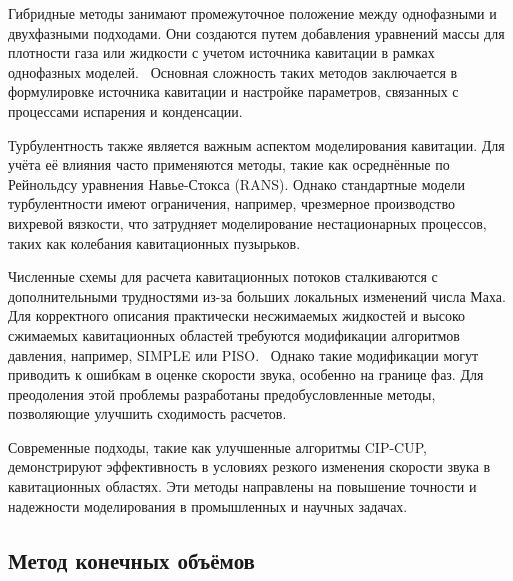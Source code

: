 Гибридные методы занимают промежуточное положение между однофазными и двухфазными подходами. Они создаются путем добавления уравнений массы для плотности газа или жидкости с учетом источника кавитации в рамках однофазных моделей.~\cite{10.1016/s0045-7930(99)00039-0, 10.1007/s00773-003-0162-6} Основная сложность таких методов заключается в формулировке источника кавитации и настройке параметров, связанных с процессами испарения и конденсации.

Турбулентность также является важным аспектом моделирования кавитации. Для учёта её влияния часто применяются методы, такие как осреднённые по Рейнольдсу уравнения Навье-Стокса (RANS). Однако стандартные модели турбулентности имеют ограничения, например, чрезмерное производство вихревой вязкости, что затрудняет моделирование нестационарных процессов, таких как колебания кавитационных пузырьков.  

Численные схемы для расчета кавитационных потоков сталкиваются с дополнительными трудностями из-за больших локальных изменений числа Маха. Для корректного описания практически несжимаемых жидкостей и высоко сжимаемых кавитационных областей требуются модификации алгоритмов давления, например, SIMPLE или PISO.~\cite{10.1006/jcph.2002.6992, 10.1016/s0045-7930(98)00061-9} Однако такие модификации могут приводить к ошибкам в оценке скорости звука, особенно на границе фаз. Для преодоления этой проблемы разработаны предобусловленные методы, позволяющие улучшить сходимость расчетов.  

Современные подходы, такие как улучшенные алгоритмы CIP-CUP, демонстрируют эффективность в условиях резкого изменения скорости звука в кавитационных областях. Эти методы направлены на повышение точности и надежности моделирования в промышленных и научных задачах.~\cite{10.1016/s1001-6058(11)60389-3}


\vspace{0.5\baselineskip}
\subsection{Метод конечных объёмов}
\vspace{0.5\baselineskip}


